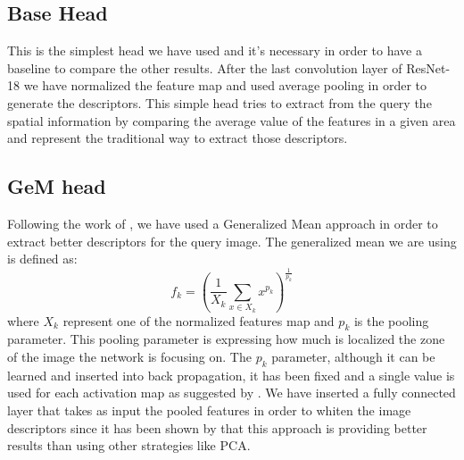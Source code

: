 \documentclass[10pt,twocolumn,letterpaper]{article}
\begin{document}
\subsection{Base Head}
This is the simplest head we have used and it's necessary in order to have a baseline to compare the other
results. After the last convolution layer of ResNet-18 we have normalized the feature map and used average 
pooling in order to generate the descriptors. This simple head tries to extract from the query the spatial
information by comparing the average value of the features in a given area and represent the traditional way 
to extract those descriptors.

\subsection{GeM head}
Following the work of \cite{GEM}, we have used a Generalized Mean approach in order to extract better 
descriptors for the query image. The generalized mean we are using is defined as:
\begin{equation}
	f_k = ({\frac{1}{X_k}} \sum_{x \in X_k} x^{p_k} ) ^ {\frac{1}{p_k}}
\end{equation}
where $X_k $ represent one of the normalized features map and $p_k $ is the pooling parameter. This 
pooling parameter is expressing how much is localized the zone of the image the network is focusing on.
The $p_k $ parameter, although it can be learned and inserted into back propagation, it has been fixed
and a single value is used for each activation map as suggested by \cite{GEM}. We have
inserted a fully connected layer that takes as input the pooled features in order to whiten the image
descriptors since it has been shown by \cite{GEM} that this approach is providing better results than
using other strategies like PCA.
\end{document}
